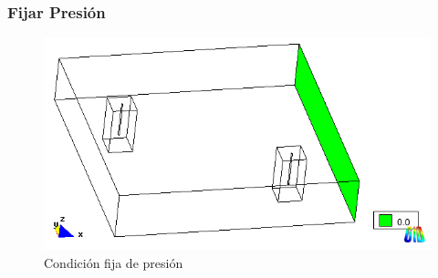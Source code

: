 \documentclass[spanish]{beamer}
\begin{document}
\subsubsection{Fijar Presión}
\begin{frame}\begin{center}
\begin{figure}[tbhp]
\centerline{\includegraphics[scale=0.4]{../img/100m/100_condiciones_presion0}}
\caption{Condición fija de presión}
\label{100_condiciones_presion0}
\end{figure}
\end{center}
\end{frame}
\end{document}
